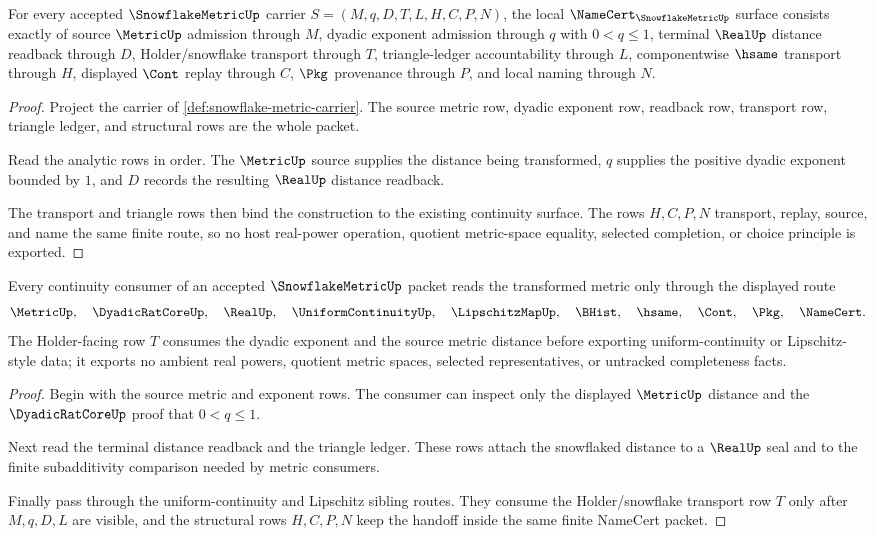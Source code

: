 \begin{theorem}
\label{thm:snowflake-metric-namecert-obligations}
For every accepted $\SnowflakeMetricUp$ carrier $S=(M,q,D,T,L,H,C,P,N)$, the local $\NameCert_{\SnowflakeMetricUp}$ surface consists exactly of source $\MetricUp$ admission through $M$, dyadic exponent admission through $q$ with $0<q\leq 1$, terminal $\RealUp$ distance readback through $D$, Holder/snowflake transport through $T$, triangle-ledger accountability through $L$, componentwise $\hsame$ transport through $H$, displayed $\Cont$ replay through $C$, $\Pkg$ provenance through $P$, and local naming through $N$.
\end{theorem}
\begin{proof}
Project the carrier of \autoref{def:snowflake-metric-carrier}. The source metric row, dyadic exponent row, readback row, transport row, triangle ledger, and structural rows are the whole packet.

Read the analytic rows in order. The $\MetricUp$ source supplies the distance being transformed, $q$ supplies the positive dyadic exponent bounded by $1$, and $D$ records the resulting $\RealUp$ distance readback.

The transport and triangle rows then bind the construction to the existing continuity surface. The rows $H,C,P,N$ transport, replay, source, and name the same finite route, so no host real-power operation, quotient metric-space equality, selected completion, or choice principle is exported.
\end{proof}

\begin{theorem}
\label{thm:snowflake-metric-holder-route}
Every continuity consumer of an accepted $\SnowflakeMetricUp$ packet reads the transformed metric only through the displayed route
$$
\MetricUp,\quad \DyadicRatCoreUp,\quad \RealUp,\quad \UniformContinuityUp,\quad \LipschitzMapUp,\quad \BHist,\quad \hsame,\quad \Cont,\quad \Pkg,\quad \NameCert .
$$
The Holder-facing row $T$ consumes the dyadic exponent and the source metric distance before exporting uniform-continuity or Lipschitz-style data; it exports no ambient real powers, quotient metric spaces, selected representatives, or untracked completeness facts.
\end{theorem}
\begin{proof}
Begin with the source metric and exponent rows. The consumer can inspect only the displayed $\MetricUp$ distance and the $\DyadicRatCoreUp$ proof that $0<q\leq 1$.

Next read the terminal distance readback and the triangle ledger. These rows attach the snowflaked distance to a $\RealUp$ seal and to the finite subadditivity comparison needed by metric consumers.

Finally pass through the uniform-continuity and Lipschitz sibling routes. They consume the Holder/snowflake transport row $T$ only after $M,q,D,L$ are visible, and the structural rows $H,C,P,N$ keep the handoff inside the same finite NameCert packet.
\end{proof}

